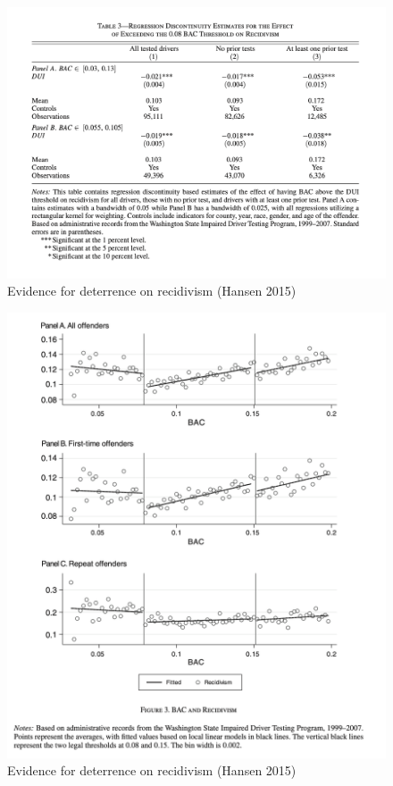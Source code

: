 \documentclass{beamer}
\begin{document}
\begin{frame}

	\begin{figure}
	\includegraphics[scale=0.35]{./lecture_includes/hansen_table2}
	\caption{Evidence for deterrence on recidivism (Hansen 2015)}
	\end{figure}
\end{frame}


\begin{frame}

	\begin{figure}
	\includegraphics[scale=0.35]{./lecture_includes/hansen_fig4}
	\caption{Evidence for deterrence on recidivism (Hansen 2015)}
	\end{figure}
\end{frame}
\end{document}
